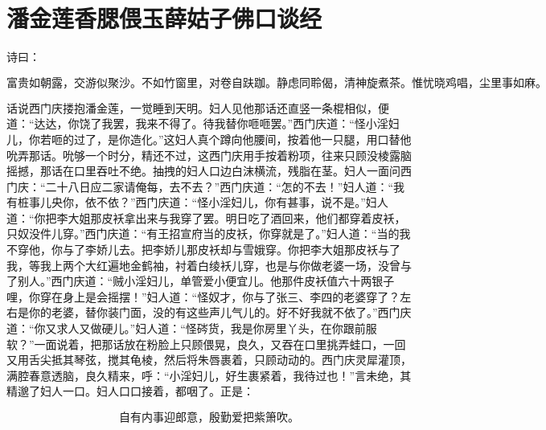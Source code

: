 

\chapter{潘金莲香腮偎玉\KG 薛姑子佛口谈经}


诗曰：

\[
富贵如朝露，交游似聚沙。不如竹窗里，对卷自趺跏。
静虑同聆偈，清神旋煮茶。惟忧晓鸡唱，尘里事如麻。
\]

话说西门庆搂抱潘金莲，一觉睡到天明。妇人见他那话还直竖一条棍相似，便道：“达达，你饶了我罢，我来不得了。待我替你咂咂罢。”西门庆道：“怪小淫妇儿，你若咂的过了，是你造化。”这妇人真个蹲向他腰间，按着他一只腿，用口替他吮弄那话。吮够一个时分，精还不过，这西门庆用手按着粉项，往来只顾没棱露脑摇撼，那话在口里吞吐不绝。抽拽的妇人口边白沫横流，残脂在茎。妇人一面问西门庆：“二十八日应二家请俺每，去不去？”西门庆道：“怎的不去！”妇人道：“我有桩事儿央你，依不依？”西门庆道：“怪小淫妇儿，你有甚事，说不是。”妇人道：“你把李大姐那皮袄拿出来与我穿了罢。明日吃了酒回来，他们都穿着皮袄，只奴没件儿穿。”西门庆道：“有王招宣府当的皮袄，你穿就是了。”妇人道：“当的我不穿他，你与了李娇儿去。把李娇儿那皮袄却与雪娥穿。你把李大姐那皮袄与了我，等我上两个大红遍地金鹤袖，衬着白绫袄儿穿，也是与你做老婆一场，没曾与了别人。”西门庆道：“贼小淫妇儿，单管爱小便宜儿。他那件皮袄值六十两银子哩，你穿在身上是会摇摆！”妇人道：“怪奴才，你与了张三、李四的老婆穿了？左右是你的老婆，替你装门面，没的有这些声儿气儿的。好不好我就不依了。”西门庆道：“你又求人又做硬儿。”妇人道：“怪硶货，我是你房里丫头，在你跟前服软？”一面说着，把那话放在粉脸上只顾偎晃，良久，又吞在口里挑弄蛙口，一回又用舌尖抵其琴弦，搅其龟棱，然后将朱唇裹着，只顾动动的。西门庆灵犀灌顶，满腔春意透脑，良久精来，呼：“小淫妇儿，好生裹紧着，我待过也！”言未绝，其精邈了妇人一口。妇人口口接着，都咽了。正是：

\[
自有内事迎郎意，殷勤爱把紫箫吹。
\]

